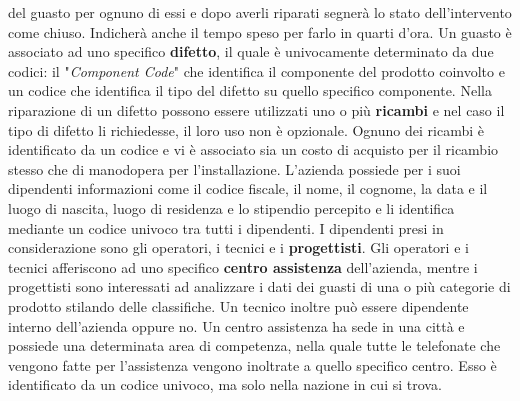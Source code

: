 \documentclass[a4paper, 12pt]{report}
\begin{document}
del guasto per ognuno di essi e dopo averli riparati segnerà lo stato dell'intervento come chiuso. Indicherà anche il tempo speso per farlo in quarti d'ora.\newline
Un guasto è associato ad uno specifico \textbf{difetto}, il quale è univocamente determinato da due codici: il "\textit{Component Code}"
che identifica il componente del prodotto coinvolto e un codice che identifica il tipo del difetto su quello specifico componente. Nella
riparazione di un difetto possono essere utilizzati uno o più \textbf{ricambi} e nel caso il tipo di difetto li richiedesse, il loro uso non è opzionale.
Ognuno dei ricambi è identificato da un codice e vi è associato sia un costo di acquisto per il ricambio stesso che di manodopera per l'installazione.\newline
L'azienda possiede per i suoi dipendenti informazioni come il codice fiscale, il nome, il cognome, la data e il luogo di nascita, luogo di
residenza e lo stipendio percepito e li identifica mediante un codice univoco tra tutti i dipendenti. I dipendenti presi in considerazione sono gli operatori, i tecnici e i
\textbf{progettisti}. Gli operatori e i tecnici afferiscono ad uno specifico \textbf{centro assistenza} dell'azienda,
mentre i progettisti sono interessati ad analizzare i dati dei guasti di una o più categorie di prodotto stilando delle classifiche. Un tecnico
inoltre può essere dipendente interno dell'azienda oppure no.\newline
Un centro assistenza ha sede in una città e possiede una determinata area di competenza, nella quale tutte le telefonate che vengono fatte
per l'assistenza vengono inoltrate a quello specifico centro. Esso è identificato da un codice univoco, ma solo nella nazione in cui si trova.\newline
\end{document}
